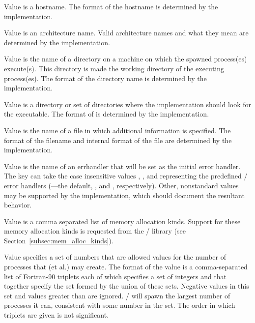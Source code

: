 \begin{description}
\item[:] Value is a hostname. The format of the hostname is determined by
the implementation.

\item[:] Value is an architecture name. Valid architecture names and
what they mean are determined by the implementation.

\item[:] Value is the name of a directory on a machine on which
the spawned process(es) execute(s).
This directory is made the working directory of the executing process(es).
The format of the directory name is determined by the implementation.

\item[:] Value is a directory or set of directories
where the implementation should look for the executable.
The format of  is determined by the implementation.

\item[:] Value is the name of a file in which additional information
is specified. The format of the filename and internal format of the file
are determined by the implementation.

\item[:] Value is the name of an errhandler that will be
set as the initial error handler. 
The  key can take the case insensitive values , ,
and  representing the predefined \MPI/ error handlers
(---the default, , and
, respectively). Other, nonstandard values may be
supported by the implementation, which should document the resultant behavior.

{\sloppy %
\item[\infokey{mpi\_memory\_alloc\_kinds} (string, default: \infovalskip{mpi,system}):]
Value is a comma separated list of memory allocation kinds.
Support for these memory allocation kinds is requested from the \MPI/ library
(see Section~\ref{subsec:mem_alloc_kinds}).

}

\item[\infokey{soft}:] Value specifies a set of numbers that are allowed values
for the number of processes that  (et al.) may create.
The format of the value is a comma-separated list of Fortran-90
triplets each of which specifies a set of integers and that together specify
the set formed by the union of these sets.
Negative values in this set  and values greater than  are
ignored. \MPI/ will spawn the largest number of processes it can,
consistent with some number in the set. The order in which
triplets are given is not significant.


\end{description}

